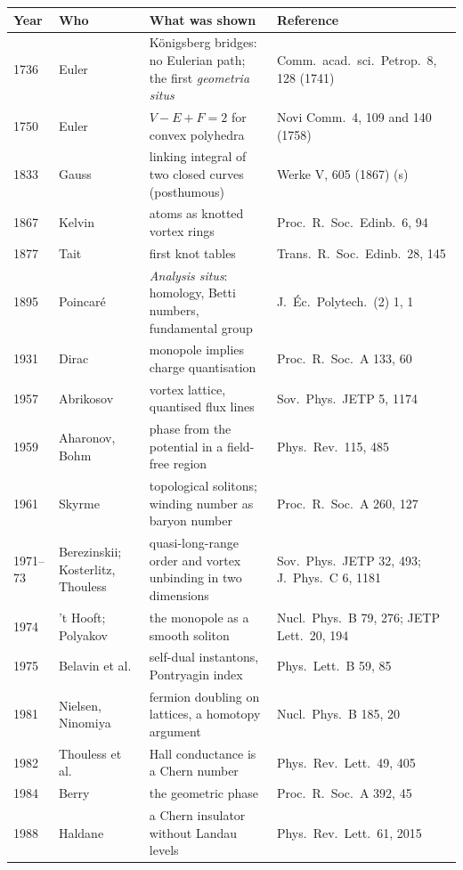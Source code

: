 \documentclass[11pt,a4paper]{article}
\begin{document}
\begin{center}\small
\begin{longtable}{p{1.3cm}p{3.1cm}p{6.4cm}p{4.2cm}}
\toprule Year & Who & What was shown & Reference \\ \midrule
1736 & Euler & Königsberg bridges: no Eulerian path; the first \emph{geometria situs} & Comm.\ acad.\ sci.\ Petrop.\ 8, 128 (1741) \\
1750 & Euler & $V-E+F=2$ for convex polyhedra & Novi Comm.\ 4, 109 and 140 (1758) \\
1833 & Gauss & linking integral of two closed curves (posthumous) & Werke V, 605 (1867) (s) \\
1867 & Kelvin & atoms as knotted vortex rings & Proc.\ R.\ Soc.\ Edinb.\ 6, 94 \\
1877 & Tait & first knot tables & Trans.\ R.\ Soc.\ Edinb.\ 28, 145 \\
1895 & Poincaré & \emph{Analysis situs}: homology, Betti numbers, fundamental group & J.\ Éc.\ Polytech.\ (2) 1, 1 \\
1931 & Dirac & monopole implies charge quantisation & Proc.\ R.\ Soc.\ A 133, 60 \\
1957 & Abrikosov & vortex lattice, quantised flux lines & Sov.\ Phys.\ JETP 5, 1174 \\
1959 & Aharonov, Bohm & phase from the potential in a field-free region & Phys.\ Rev.\ 115, 485 \\
1961 & Skyrme & topological solitons; winding number as baryon number & Proc.\ R.\ Soc.\ A 260, 127 \\
1971--73 & Berezinskii; Kosterlitz, Thouless & quasi-long-range order and vortex unbinding in two dimensions & Sov.\ Phys.\ JETP 32, 493; J.\ Phys.\ C 6, 1181 \\
1974 & 't Hooft; Polyakov & the monopole as a smooth soliton & Nucl.\ Phys.\ B 79, 276; JETP Lett.\ 20, 194 \\
1975 & Belavin et al. & self-dual instantons, Pontryagin index & Phys.\ Lett.\ B 59, 85 \\
1981 & Nielsen, Ninomiya & fermion doubling on lattices, a homotopy argument & Nucl.\ Phys.\ B 185, 20 \\
1982 & Thouless et al. & Hall conductance is a Chern number & Phys.\ Rev.\ Lett.\ 49, 405 \\
1984 & Berry & the geometric phase & Proc.\ R.\ Soc.\ A 392, 45 \\
1988 & Haldane & a Chern insulator without Landau levels & Phys.\ Rev.\ Lett.\ 61, 2015 \\

\end{longtable}
\end{center}
\end{document}
